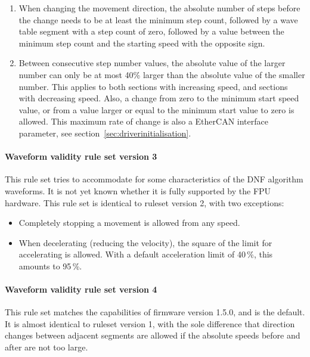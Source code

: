 \documentclass[11pt,a4paper]{report}
\begin{document}
\begin{enumerate}
\item When changing the movement direction, the absolute number of
  steps before the change needs to be at least the minimum step count,
  followed by a wave table segment with a step count of zero, followed
  by a value between the minimum step count and the starting speed
  with the opposite sign.

\item Between consecutive step number values, the absolute value of
  the larger number can only be at most 40\% larger than the absolute
  value of the smaller number. This applies to both sections with
  increasing speed, and sections with decreasing speed. Also, a change
  from zero to the minimum start speed value, or from a value larger
  or equal to the minimum start value to zero is allowed. This maximum
  rate of change is also a EtherCAN interface parameter, see
  section~\ref{sec:driverinitialisation}.

  
\end{enumerate}

\paragraph{Waveform validity rule set version 3}

This rule set tries to accommodate for some characteristics of the DNF
algorithm waveforms. It is not yet known whether it is fully supported
by the FPU hardware. This rule set is identical to ruleset version 2,
with two exceptions:

\begin{itemize}
\item Completely stopping a movement is allowed from any speed.
\item When decelerating (reducing the velocity), the square of
  the limit for accelerating is allowed. With a default
  acceleration limit of 40\,\%, this amounts to 95\,\%.
\end{itemize}


\paragraph{Waveform validity rule set version 4}
\label{sec:wfrulesetv4}

This rule set matches the capabilities of firmware version 1.5.0, and
is the default. It is almost identical to ruleset version 1, with the
sole difference that direction changes between adjacent segments are
allowed if the absolute speeds before and after are not too large.
\end{document}
